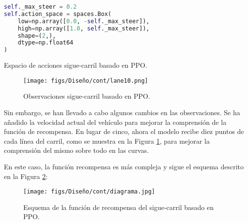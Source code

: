 \begin{code}[h]
\begin{lstlisting}[language=Python]
self._max_steer = 0.2
self.action_space = spaces.Box(
    low=np.array([0.0, -self._max_steer]),
    high=np.array([1.0, self._max_steer]),
    shape=(2,),
    dtype=np.float64
)
\end{lstlisting}
\caption[Espacio de acciones sigue-carril basado en \ac{PPO}]{Espacio de acciones sigue-carril basado en \ac{PPO}.}
\label{cod:acc_ppo}
\end{code}

\begin{figure}[ht]
\centering
\texttt{[image: figs/Diseño/cont/lane10.png]}
\caption{Observaciones sigue-carril basado en \ac{PPO}.}
\label{fig:puntos_carril_ppo}
\end{figure}

Sin embargo, se han llevado a cabo algunos cambios en las observaciones. Se ha añadido la velocidad actual del vehículo para mejorar la comprensión de la función de recompensa. En lugar de cinco, ahora el modelo recibe diez puntos de cada línea del carril, como se muestra en la Figura \ref{fig:puntos_carril_ppo}, para mejorar la comprensión del mismo sobre todo en las curvas.

En este caso, la función recompensa es más compleja y sigue el esquema descrito en la Figura \ref{fig:esquema_PPO}:

\begin{figure}[ht]
\centering
\texttt{[image: figs/Diseño/cont/diagrama.jpg]}
\caption{Esquema de la función de recompensa del sigue-carril basado en \ac{PPO}.}
\label{fig:esquema_PPO}
\end{figure}

